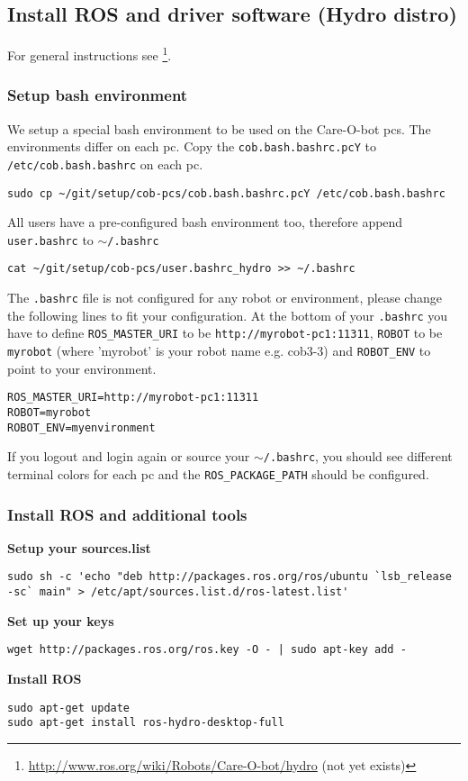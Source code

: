 \subsection{Install ROS and driver software (Hydro distro)}
For general instructions see \footnote{\url{http://www.ros.org/wiki/Robots/Care-O-bot/hydro} (not yet exists)}.

\subsubsection{Setup bash environment}
We setup a special bash environment to be used on the Care-O-bot pcs. The environments differ on each pc. Copy the \texttt{cob.bash.bashrc.pcY} to \texttt{/etc/cob.bash.bashrc} on each pc.

\begin{lstlisting}
sudo cp ~/git/setup/cob-pcs/cob.bash.bashrc.pcY /etc/cob.bash.bashrc
\end{lstlisting}

All users have a pre-configured bash environment too, therefore append \texttt{user.bashrc} to \texttt{$\sim$/.bashrc}
\begin{lstlisting}
cat ~/git/setup/cob-pcs/user.bashrc_hydro >> ~/.bashrc
\end{lstlisting}
The \texttt{.bashrc} file is not configured for any robot or environment, please change the following lines to fit your configuration. At the bottom of your \texttt{.bashrc} you have to define \texttt{ROS\_MASTER\_URI} to be \texttt{http://myrobot-pc1:11311}, \texttt{ROBOT} to be \texttt{myrobot} (where 'myrobot' is your robot name e.g. cob3-3) and \texttt{ROBOT\_ENV} to point to your environment.
\begin{lstlisting}
ROS_MASTER_URI=http://myrobot-pc1:11311
ROBOT=myrobot
ROBOT_ENV=myenvironment
\end{lstlisting}

If you logout and login again or source your \texttt{$\sim$/.bashrc}, you should see different terminal colors for each pc and the \texttt{ROS\_PACKAGE\_PATH} should be configured. 

\subsubsection{Install ROS and additional tools}


\textbf{Setup your sources.list}
\begin{lstlisting}
sudo sh -c 'echo "deb http://packages.ros.org/ros/ubuntu `lsb_release -sc` main" > /etc/apt/sources.list.d/ros-latest.list'
\end{lstlisting}
\textbf{Set up your keys}
\begin{lstlisting}
wget http://packages.ros.org/ros.key -O - | sudo apt-key add -
\end{lstlisting}
\textbf{Install ROS}
\begin{lstlisting}
sudo apt-get update
sudo apt-get install ros-hydro-desktop-full
\end{lstlisting}

